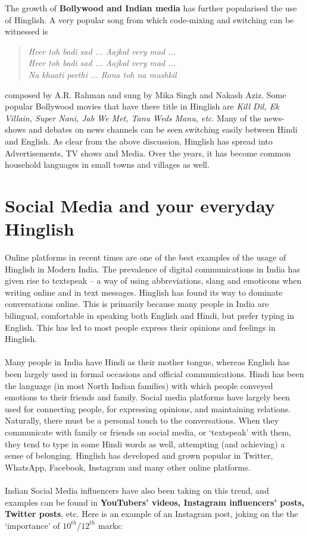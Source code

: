 \documentclass{article}
\begin{document}
The growth of \textbf{Bollywood and Indian media} has further popularised the use of Hinglish. A very popular song from which code-mixing and switching can be witnessed is
\begin{quote}
    \centering
    \textit{Heer toh badi sad ... Aajkal very mad ...\\ Heer toh badi sad ...
        Aajkal very mad ...\\ Na khaati peethi ... Rona toh na mushkil}
\end{quote}
composed by A.R. Rahman and sung by Mika Singh and Nakash Aziz. Some popular Bollywood movies that have there title in Hinglish are \textit{Kill Dil, Ek Villain, Super Nani, Jab We Met, Tanu Weds Manu, etc}. Many of the news-shows and debates on news channels can be seen switching easily between Hindi and English. As clear from the above discussion, Hinglish has spread into Advertisements, TV shows and Media. Over the years, it has become common household languages in small towns and villages as well.

\section {Social Media and your everyday Hinglish}
Online platforms in recent times are one of the best examples of the usage of Hinglish in Modern India. The prevalence of digital communications in India has given rise to textspeak – a way of using abbreviations, slang and emoticons when writing online and in text messages. Hinglish has found its way to dominate conversations online. This is primarily because many people in India are bilingual, comfortable in speaking both English and Hindi, but prefer typing in English. This has led to most people express their opinions and feelings in Hinglish.
\\\\
Many people in India have Hindi as their mother tongue, whereas English has been largely used in formal occasions and official communications. Hindi has been the language (in most North Indian families) with which people conveyed emotions to their friends and family. Social media platforms have largely been used for connecting people, for expressing opinions, and maintaining relations. Naturally, there must be a personal touch to the conversations. When they communicate with family or friends on social media, or `textspeak' with them, they tend to type in some Hindi words as well, attempting (and achieving) a sense of belonging. Hinglish has developed and grown popular in Twitter, WhatsApp, Facebook, Instagram and many other online platforms.
\\\\
Indian Social Media influencers have also been taking on this trend, and examples can be found in \textbf{YouTubers' videos, Instagram influencers' posts, Twitter posts}, etc. Here is an example of an Instagram post, joking on the the `importance' of $10^{th}$/$12^{th}$ marks:
\end{document}
